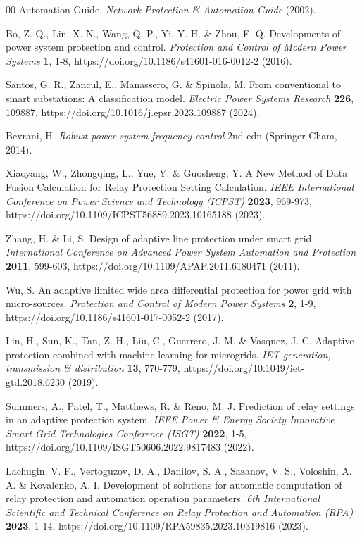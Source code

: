 \documentclass{article}
\begin{document}
\begin{thebibliography}{00}
 Automation Guide. \emph{Network Protection \& Automation Guide} (2002).

 Bo, Z. Q., Lin, X. N., Wang, Q. P., Yi, Y. H. \& Zhou, F. Q. Developments of power system protection and control. \emph{Protection and Control of Modern Power Systems} \textbf{1}, 1-8, https://doi.org/10.1186/s41601-016-0012-2 (2016).

 Santos, G. R., Zancul, E., Manassero, G. \& Spinola, M. From conventional to smart substations: A classification model. \emph{Electric Power Systems Research} \textbf{226}, 109887, https://doi.org/10.1016/j.epsr.2023.109887 (2024).

 Bevrani, H. \emph{Robust power system frequency control} 2nd edn (Springer Cham, 2014).

 Xiaoyang, W., Zhongqing, L., Yue, Y. \& Guosheng, Y. A New Method of Data Fusion Calculation for Relay Protection Setting Calculation. \emph{IEEE International Conference on Power Science and Technology (ICPST)} \textbf{2023}, 969-973, https://doi.org/10.1109/ICPST56889.2023.10165188 (2023).

 Zhang, H. \& Li, S. Design of adaptive line protection under smart grid. \emph{International Conference on Advanced Power System Automation and Protection} \textbf{2011}, 599-603, https://doi.org/10.1109/APAP.2011.6180471 (2011).

 Wu, S. An adaptive limited wide area differential protection for power grid with micro-sources. \emph{Protection and Control of Modern Power Systems} \textbf{2}, 1-9, https://doi.org/10.1186/s41601-017-0052-2 (2017).

 Lin, H., Sun, K., Tan, Z. H., Liu, C., Guerrero, J. M. \& Vasquez, J. C. Adaptive protection combined with machine learning for microgrids. \emph{IET generation, transmission \& distribution} \textbf{13}, 770-779, https://doi.org/10.1049/iet-gtd.2018.6230 (2019).

 Summers, A., Patel, T., Matthews, R. \& Reno, M. J. Prediction of relay settings in an adaptive protection system. \emph{IEEE Power \& Energy Society Innovative Smart Grid Technologies Conference (ISGT)} \textbf{2022}, 1-5, https://doi.org/10.1109/ISGT50606.2022.9817483 (2022).

 Lachugin, V. F., Vertoguzov, D. A., Danilov, S. A., Sazanov, V. S., Voloshin, A. A. \& Kovalenko, A. I. Development of solutions for automatic computation of relay protection and automation operation parameters. \emph{6th International Scientific and Technical Conference on Relay Protection and Automation (RPA)} \textbf{2023}, 1-14, https://doi.org/10.1109/RPA59835.2023.10319816 (2023).


\end{thebibliography}
\end{document}

